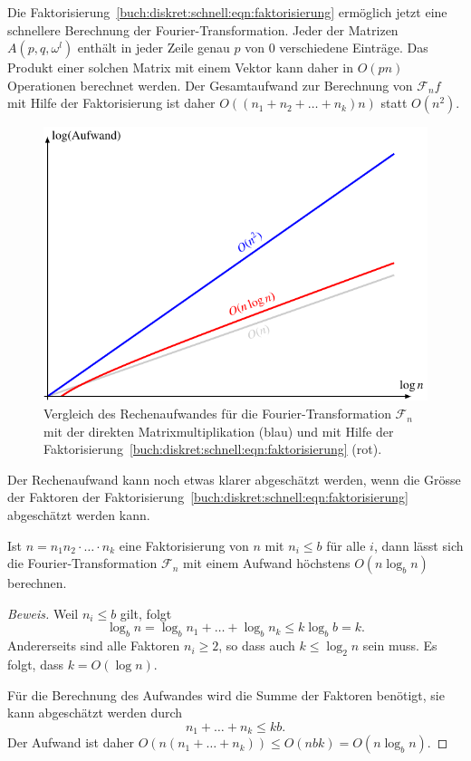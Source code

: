 Die Faktorisierung~\eqref{buch:diskret:schnell:eqn:faktorisierung}
ermöglich jetzt eine schnellere Berechnung der Fourier-Transformation.
Jeder der Matrizen $A(p,q,\omega^l)$ enthält in jeder Zeile genau
$p$ von $0$ verschiedene Einträge.
Das Produkt einer solchen Matrix mit einem Vektor kann daher in 
$O(pn)$ Operationen berechnet werden.
Der Gesamtaufwand zur Berechnung von $\mathscr{F}_nf$ mit Hilfe
der Faktorisierung ist daher 
\(
O((n_1+n_2+\dots+n_k)n)
\)
statt $O(n^2)$.

\begin{figure}
\centering
\includegraphics{chapters/060-diskret/images/log.pdf}
\caption{Vergleich des Rechenaufwandes für die Fourier-Transformation
$\mathscr{F}_n$ mit der direkten Matrixmultiplikation (blau) und
mit Hilfe der 
Faktorisierung~\eqref{buch:diskret:schnell:eqn:faktorisierung}
(rot).
\label{buch:diskret:schnell:fig:log}}
\end{figure}%

Der Rechenaufwand kann noch etwas klarer abgeschätzt werden, wenn 
die Grösse der Faktoren der 
Faktorisierung~\eqref{buch:diskret:schnell:eqn:faktorisierung}
abgeschätzt werden kann.

\begin{satz}[Aufwand]
\label{buch:diskret:schnell:satz:aufwand}
Ist $n=n_1n_2\cdot\ldots\cdot n_k$ eine Faktorisierung von $n$
mit $n_i\le b$ für alle $i$, dann lässt sich die Fourier-Transformation
$\mathscr{F}_n$ mit einem Aufwand höchstens $O(n\log_b n)$ berechnen.
\end{satz}

\begin{proof}[Beweis]
Weil $n_i\le b$ gilt, folgt
\[
\log_b n=\log_bn_1+ \ldots +\log_b n_k
\le 
k\log_b b
=
k.
\]
Andererseits sind alle Faktoren $n_i\ge 2$, so dass auch $k\le \log_2 n$
sein muss.
Es folgt, dass $k=O(\log n)$.

Für die Berechnung des Aufwandes wird die Summe der Faktoren benötigt,
sie kann abgeschätzt werden durch
\[
n_1+\ldots+n_k
\le
kb.
\]
Der Aufwand ist daher
\(
O(n(n_1+\ldots+n_k))
\le
O(nbk)
=
O(n\log_b n)
\).
\end{proof}

